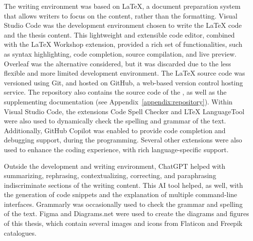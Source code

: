 The writing environment was based on \LaTeX{}, a document preparation system that allows writers to focus on the content, rather than the formatting. Visual Studio Code was the development environment chosen to write the LaTeX code and the thesis content. This lightweight and extensible code editor, combined with the LaTeX Workshop extension, provided a rich set of functionalities, such as syntax highlighting, code completion, source compilation, and live preview. Overleaf was the alternative considered, but it was discarded due to the less flexible and more limited development environment. The LaTeX source code was versioned using Git, and hosted on GitHub, a web-based version control hosting service. The repository also contains the source code of the \poc{}, as well as the supplementing documentation (see Appendix~\ref{appendix:repository}). Within Visual Studio Code, the extensions Code Spell Checker and LTeX LanguageTool were also used to dynamically check the spelling and grammar of the text. Additionally, GitHub Copilot was enabled to provide code completion and debugging support, during the \poc{} programming. Several other extensions were also used to enhance the coding experience, with rich language-specific support.

Outside the development and writing environment, ChatGPT helped with summarizing, rephrasing, contextualizing, correcting, and paraphrasing indiscriminate sections of the writing content. This AI tool helped, as well, with the generation of code snippets and the explanation of multiple command-line interfaces. Grammarly was occasionally used to check the grammar and spelling of the text. Figma and Diagrams.net were used to create the diagrams and figures of this thesis, which contain several images and icons from Flaticon and Freepik catalogues.